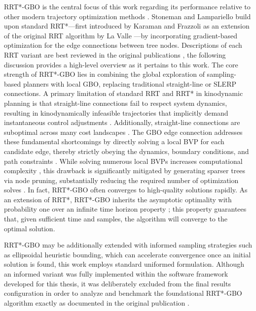 \ac{RRT*-GBO} is the central focus of this work regarding its performance relative to other modern trajectory optimization methods \cite{Stoneman14}. 
Stoneman and Lampariello \cite{Stoneman14} build upon standard \ac{RRT*}---first introduced by Karaman and Frazzoli \cite{Karaman11} as an extension of the original \ac{RRT} algorithm by La Valle \cite{LaValle06}---by incorporating gradient-based optimization for the edge connections between tree nodes. 
Descriptions of each \ac{RRT} variant are best reviewed in the original publications \cite{LaValle06,Karaman11,Stoneman14}, the following discussion provides a high-level overview as it pertains to this work.
The core strength of \ac{RRT*-GBO} lies in combining the global exploration of sampling-based planners with local \ac{GBO}, replacing traditional straight-line or \ac{SLERP} connections. 
A primary limitation of standard \ac{RRT} and \ac{RRT*} in kinodynamic planning is that straight-line connections fail to respect system dynamics, resulting in kinodynamically infeasible trajectories that implicitly demand instantaneous control adjustments \cite{Stoneman14}. 
Additionally, straight-line connections are suboptimal across many cost landscapes \cite{Stoneman14}. 
The \ac{GBO} edge connection addresses these fundamental shortcomings by directly solving a local \ac{BVP} for each candidate edge, thereby strictly obeying the dynamics, boundary conditions, and path constraints \cite{Stoneman14}. 
While solving numerous local \ac{BVP}s increases computational complexity \cite{Stoneman14}, this drawback is significantly mitigated by generating sparser trees via node pruning, substantially reducing the required number of optimization solves \cite{Stoneman14}.
In fact, \ac{RRT*-GBO} often converges to high-quality solutions rapidly.
As an extension of \ac{RRT*}, \ac{RRT*-GBO} inherits the asymptotic optimality with probability one over an infinite time horizon property \cite{Karaman11};
this property guarantees that, given sufficient time and samples, the algorithm will converge to the optimal solution.

\ac{RRT*-GBO} may be additionally extended with informed sampling strategies such as ellipsoidal heuristic bounding, which can accelerate convergence once an initial solution is found, this work employs standard uniformed formulation.
Although an informed variant was fully implemented within the software framework developed for this thesis, it was deliberately excluded from the final results configuration in order to analyze and benchmark the foundational \ac{RRT*-GBO} algorithm exactly as documented in the original publication \cite{Stoneman14}.

